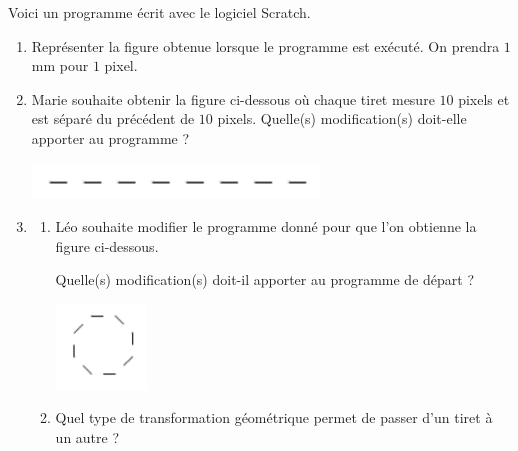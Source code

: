 Voici un programme écrit avec le logiciel Scratch.

\begin{center}
\begin{scratch}[scale=1,print]
    {
    }
\end{scratch}
\end{center}

\begin{enumerate}
    \item Représenter la figure obtenue lorsque le programme est exécuté. On prendra $1$ mm pour $1$ pixel.
    \item Marie souhaite obtenir la figure ci-dessous où chaque tiret mesure $10$ pixels et est séparé 
    du précédent de $10$ pixels. Quelle(s) modification(s) doit-elle apporter au programme ?
    \begin{center}
        \includegraphics[width=0.6\textwidth]{./images/2022-g3-ex4-img1.png}
    \end{center}
    \item 
    \begin{enumerate}
        \item Léo souhaite modifier le programme donné pour que l’on obtienne la figure ci-dessous.
        
        Quelle(s) modification(s) doit-il apporter au programme de départ ?
        \begin{center}
            \includegraphics[width=0.2\textwidth]{./images/2022-g3-ex4-img2.png}
        \end{center}
        \item Quel type de transformation géométrique permet de passer d’un tiret à un autre ?        
    \end{enumerate}
\end{enumerate}